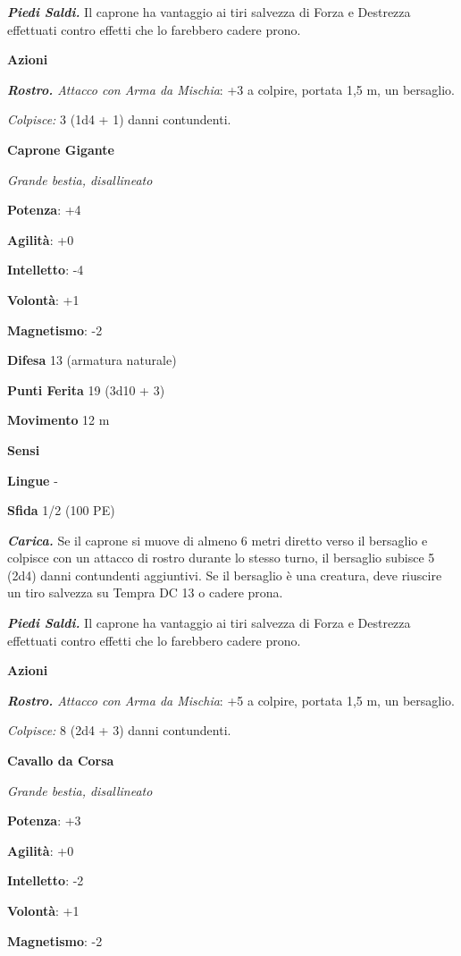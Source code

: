 \begin{multicols}{2}
\emph{\textbf{Piedi Saldi.}} Il caprone ha vantaggio ai tiri salvezza di
Forza e Destrezza effettuati contro effetti che lo farebbero cadere
prono.

\textbf{Azioni}

\emph{\textbf{Rostro.} Attacco con Arma da Mischia}: +3 a colpire,
portata 1,5 m, un bersaglio.

\emph{Colpisce:} 3 (1d4 + 1) danni contundenti.

\textbf{Caprone Gigante}

\emph{Grande bestia, disallineato}

\textbf{Potenza}: +4

\textbf{Agilità}: +0

\textbf{Intelletto}: -4

\textbf{Volontà}: +1

\textbf{Magnetismo}: -2

\textbf{Difesa} 13 (armatura naturale)

\textbf{Punti Ferita} 19 (3d10 + 3)

\textbf{Movimento} 12 m

\textbf{Sensi} 

\textbf{Lingue} -

\textbf{Sfida} 1/2 (100 PE)

\emph{\textbf{Carica.}} Se il caprone si muove di almeno 6 metri diretto
verso il bersaglio e colpisce con un attacco di rostro durante lo stesso
turno, il bersaglio subisce 5 (2d4) danni contundenti aggiuntivi. Se il
bersaglio è una creatura, deve riuscire un tiro salvezza su Tempra DC 13
o cadere prona.

\emph{\textbf{Piedi Saldi.}} Il caprone ha vantaggio ai tiri salvezza di
Forza e Destrezza effettuati contro effetti che lo farebbero cadere
prono.

\textbf{Azioni}

\emph{\textbf{Rostro.} Attacco con Arma da Mischia}: +5 a colpire,
portata 1,5 m, un bersaglio.

\emph{Colpisce:} 8 (2d4 + 3) danni contundenti.

\textbf{Cavallo da Corsa}

\emph{Grande bestia, disallineato}

\textbf{Potenza}: +3

\textbf{Agilità}: +0

\textbf{Intelletto}: -2

\textbf{Volontà}: +1

\textbf{Magnetismo}: -2


\end{multicols}
